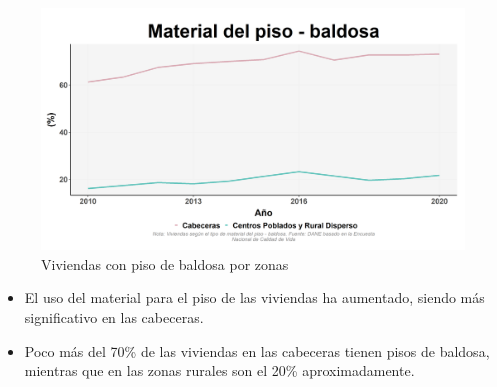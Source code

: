     \begin{figure}[H]
        \caption{Viviendas con piso de baldosa por zonas \label{map_result_2} }
        \begin{center}
        \includegraphics[width=\textwidth,keepaspectratio]{img/var_174_trend.png}
        \end{center}
    \end{figure}
            \begin{itemize}
                    \item El uso del material para el piso de las viviendas ha aumentado, siendo más significativo en las cabeceras.
                    \item Poco más del 70\% de las viviendas en las cabeceras tienen pisos de baldosa, mientras que en las zonas rurales son el 20\% aproximadamente.
                    \end{itemize}

